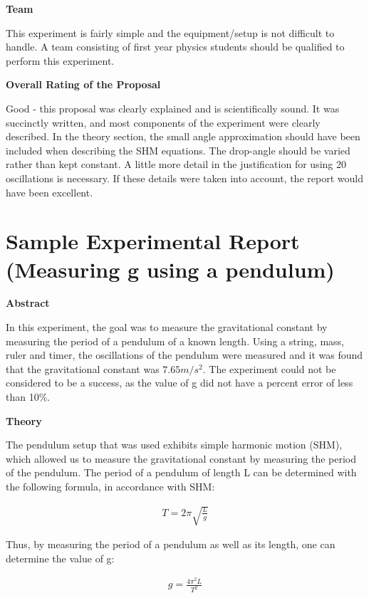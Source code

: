 \textbf{Team}

This experiment is fairly simple and the equipment/setup is not difficult to handle. A team consisting of first year physics students should be qualified to perform this experiment.

\textbf{Overall Rating of the Proposal}

Good - this proposal was clearly explained and is scientifically sound. It was succinctly written, and most components of the experiment were clearly described. In the theory section, the small angle approximation should have been included when describing the SHM equations. The drop-angle should be varied rather than kept constant. A little more detail in the justification for using 20 oscillations is necessary. If these details were taken into account, the report would have been excellent.

 \vspace{0.25cm}
\section{Sample Experimental Report (Measuring g using a pendulum)}
 \vspace{0.25cm}
\textbf{Abstract}

In this experiment, the goal was to measure the gravitational constant by measuring the period of a pendulum of a known length. Using a string, mass, ruler and timer, the oscillations of the pendulum were measured and it was found that the gravitational constant was $7.65 m/s^2$. The experiment could not be considered to be a success, as the value of g did not have a percent error of less than 10\%.

\textbf{Theory}

The pendulum setup that was used exhibits simple harmonic motion (SHM), which allowed us to measure the gravitational constant by measuring the period of the pendulum. The period of a pendulum of length L can be determined with the following formula, in accordance with SHM:

\begin{align*}
T=2\pi \sqrt {\frac{L}{g}}
\end{align*}

Thus, by measuring the period of  a pendulum as well as its length, one can determine the value of g:

\begin{align*}
g=\frac{4\pi^{2}L}{T^{2}}
\end{align*}

